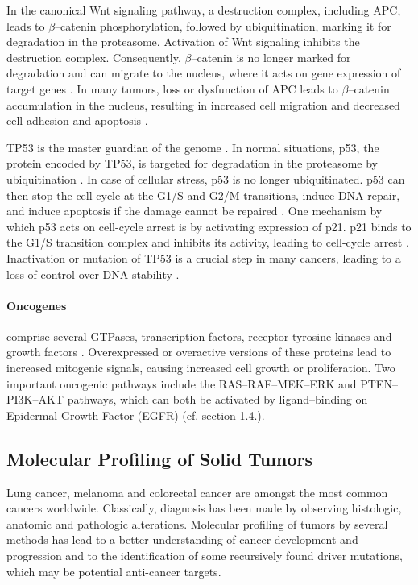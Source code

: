 {{{    In the canonical Wnt signaling pathway, a destruction complex, including
    APC, leads to $\beta$--catenin phosphorylation, followed by ubiquitination,
    marking it for degradation in the proteasome. Activation of Wnt signaling
    inhibits the destruction complex.  Consequently, $\beta$--catenin is no
    longer marked for degradation and can migrate to the nucleus, where it
    acts on gene expression of target genes {\cite{wnt_signal}}. In many tumors,
    loss or dysfunction of APC leads to $\beta$--catenin accumulation in the
    nucleus,  resulting in
    increased cell migration and decreased cell adhesion and apoptosis
    {\cite{wnt_signal_2}}.

    TP53 is the master guardian of the genome {\cite{tp53_1}}. In normal
    situations, p53, the protein encoded by TP53, is targeted for degradation
    in the proteasome by ubiquitination {\cite{tp53_2}}. In case of cellular
    stress, p53 is no longer ubiquitinated. p53 can then stop the cell cycle at
    the G1/S and G2/M transitions, induce DNA repair, and induce apoptosis if
    the damage cannot be repaired {\cite{tp53_3}}. One mechanism by which p53
    acts on cell-cycle arrest is by activating expression of p21. p21 binds to
    the G1/S transition complex and inhibits its activity, leading to
    cell-cycle arrest {\cite{tp53_3}}. Inactivation or mutation of TP53 is a
    crucial step in many cancers, leading to a loss of control over DNA
    stability {\cite{tp53_4}}.

    \paragraph{Oncogenes} comprise several GTPases, transcription factors,
    receptor tyrosine kinases and growth factors {\cite{oncogenes}}.
    Overexpressed or overactive versions of these proteins lead to increased
    mitogenic signals, causing increased cell growth or proliferation. Two
    important oncogenic pathways include the RAS--RAF--MEK--ERK and
    PTEN--PI3K--AKT pathways, which can both be activated by ligand--binding on
    Epidermal Growth Factor (EGFR) (cf. section 1.4.).

  \subsection{Molecular Profiling of Solid Tumors}

    Lung cancer, melanoma and colorectal cancer are amongst the most common
    cancers worldwide. Classically, diagnosis has been made by observing
    histologic, anatomic and pathologic alterations. Molecular
    profiling of tumors by several methods has lead to a better understanding
    of cancer development and progression and to the identification of some
    recursively found driver mutations, which may be potential anti-cancer
    targets.

}}}
